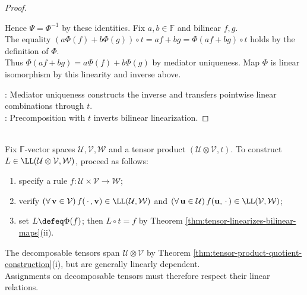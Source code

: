 \begin{theorem}
\begin{proof}
\begin{enumerate}[label=(\roman*)]
Hence $\Psi=\Phi^{-1}$ by these identities. Fix $a,b\in\mathbb{F}$ and bilinear $f,g$.\\
The equality $(a\Phi(f)+b\Phi(g))\circ t=af+bg=\Phi(af+bg)\circ t$ holds by the definition of $\Phi$.\\
Thus $\Phi(af+bg)=a\Phi(f)+b\Phi(g)$ by mediator uniqueness. Map $\Phi$ is linear isomorphism by this linearity and inverse above.
\end{enumerate}
: Mediator uniqueness constructs the inverse and transfers pointwise linear combinations through $t$.\\
: Precomposition with $t$ inverts bilinear linearization.
\end{proof}
\end{theorem}

\begin{computationmethod} \label{meth:defining-linear-maps-on-tensor-products} \\
Fix $\mathbb{F}$-vector spaces $\mathcal{U},\mathcal{V},\mathcal{W}$ and a tensor product $(\mathcal{U}\otimes\mathcal{V},t)$. To construct $L\in\LL(\mathcal{U}\otimes\mathcal{V},\mathcal{W})$, proceed as follows:
\begin{enumerate}[label=(\roman*)]
\setlength{\itemsep}{0pt}
\item specify a rule $f:\mathcal{U}\times\mathcal{V}\to\mathcal{W}$;
\item verify $(\forall\,\mathbf{v}\in\mathcal{V})\,f(\,\cdot\,,\mathbf{v})\in\LL(\mathcal{U},\mathcal{W})$ and $(\forall\,\mathbf{u}\in\mathcal{U})\,f(\mathbf{u},\,\cdot\,)\in\LL(\mathcal{V},\mathcal{W})$;
\item set $L\defeq\Phi(f)$; then $L\circ t=f$ by Theorem \ref{thm:tensor-linearizes-bilinear-maps}(ii).
\end{enumerate}
The decomposable tensors span $\mathcal{U}\otimes\mathcal{V}$ by Theorem \ref{thm:tensor-product-quotient-construction}(i), but are generally linearly dependent.\\
Assignments on decomposable tensors must therefore respect their linear relations.
\end{computationmethod}

